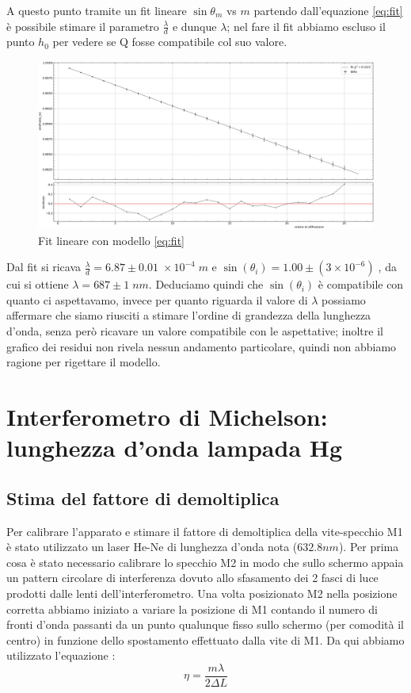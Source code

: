 \documentclass[10pt, a4paper, italian]{article}
\begin{document}
A questo punto tramite un fit lineare $\sin{\theta_m}$ vs $m$ partendo dall'equazione \ref{eq:fit} è possibile stimare il parametro $\frac{\lambda}{d}$ e dunque $\lambda$; nel fare il fit abbiamo escluso il punto $h_0$ per vedere se Q fosse compatibile col suo valore.
\begin{figure}
\includegraphics[width=\textwidth]{fit1}
\caption{\label{linfit1} Fit lineare con modello \ref{eq:fit}}
\end{figure}
Dal fit si ricava $\frac{\lambda}{d}=6.87 \pm 0.01 \;\times 10^{-4} \; m$ e $\sin(\theta _i) =1.00 \pm (3 \times 10^{-6})\;$, da cui si ottiene $\lambda=687 \pm 1 \;nm$.
Deduciamo quindi che $\sin(\theta _i)$ è compatibile con quanto ci aspettavamo, invece per quanto riguarda il valore di $\lambda$ possiamo affermare che siamo riusciti a stimare l'ordine di grandezza della lunghezza d'onda, senza però ricavare un valore compatibile con le aspettative; inoltre il grafico dei residui non rivela nessun andamento particolare, quindi non abbiamo ragione per rigettare il modello.
\section{Interferometro di Michelson: lunghezza d'onda lampada Hg}
\subsection{Stima del fattore di demoltiplica}
Per calibrare l'apparato e stimare il fattore di demoltiplica della vite-specchio M1 è stato utilizzato un laser He-Ne di lunghezza d'onda nota ($632.8 nm$).
Per prima cosa è stato necessario calibrare lo specchio M2 in modo che sullo schermo appaia un pattern circolare di interferenza dovuto allo sfasamento dei 2 fasci di luce prodotti dalle lenti dell'interferometro.
Una volta posizionato M2 nella posizione corretta abbiamo iniziato a variare la posizione di M1 contando il numero di fronti d'onda passanti da un punto qualunque fisso sullo schermo (per comodità il centro) in funzione dello spostamento effettuato dalla vite di M1. Da qui abbiamo utilizzato l'equazione :
\begin{equation}
\eta= \frac{m \lambda}{2 \Delta L}
\label{dem}
\end{equation}
\end{document}

